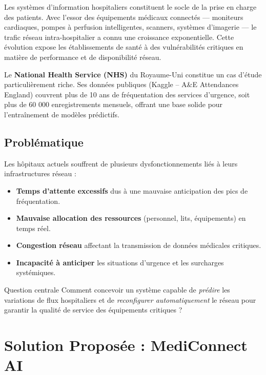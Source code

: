 \documentclass[12pt,a4paper]{article}
\begin{document}
Les systèmes d'information hospitaliers constituent le socle de la prise en charge des patients. Avec l'essor des équipements médicaux connectés — moniteurs cardiaques, pompes à perfusion intelligentes, scanners, systèmes d'imagerie — le trafic réseau intra-hospitalier a connu une croissance exponentielle. Cette évolution expose les établissements de santé à des vulnérabilités critiques en matière de performance et de disponibilité réseau.

Le \textbf{National Health Service (NHS)} du Royaume-Uni constitue un cas d'étude particulièrement riche. Ses données publiques (Kaggle -- A\&E Attendances England) couvrent plus de 10 ans de fréquentation des services d'urgence, soit plus de 60 000 enregistrements mensuels, offrant une base solide pour l'entraînement de modèles prédictifs.

\subsection{Problématique}

Les hôpitaux actuels souffrent de plusieurs dysfonctionnements liés à leurs infrastructures réseau :

\begin{itemize}[leftmargin=1.5cm]
  \item \textbf{Temps d'attente excessifs} dus à une mauvaise anticipation des pics de fréquentation.
  \item \textbf{Mauvaise allocation des ressources} (personnel, lits, équipements) en temps réel.
  \item \textbf{Congestion réseau} affectant la transmission de données médicales critiques.
  \item \textbf{Incapacité à anticiper} les situations d'urgence et les surcharges systémiques.
\end{itemize}

\begin{infobox}{Question centrale}
Comment concevoir un système capable de \textit{prédire} les variations de flux hospitaliers et de \textit{reconfigurer automatiquement} le réseau pour garantir la qualité de service des équipements critiques ?
\end{infobox}

\section{Solution Proposée : MediConnect AI}
\end{document}
